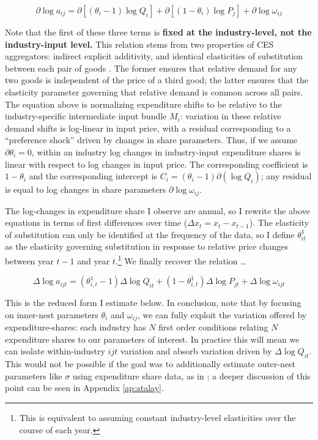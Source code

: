 \documentclass[11pt]{article}
\begin{document}
\[
\partial \log a_{ij} = \partial [(\theta_i - 1) \log Q_{i}] + \partial[(1-\theta_i)\log P_j] + \partial \log \omega_{ij}
\]

Note that the first of these three terms is \textbf{fixed at the industry-level, not the industry-input level.} This relation stems from two properties of CES aggregators: indirect explicit additivity, and identical elasticities of substitution between each pair of goods \citep{matsuyamaNonCESAggregatorsGuided2023}. The former ensures that relative demand for any two goods is independent of the price of a third good; the latter ensures that the elasticity parameter governing that relative demand is common across all pairs. The equation above is normalizing expenditure shifts to be relative to the industry-specific intermediate input bundle $M_i$: variation in these relative demand shifts is log-linear in input price, with a residual corresponding to a ``preference shock'' driven by changes in share parameters. Thus, if we assume $\partial \theta_i = 0$, within an industry log changes in industry-input expenditure shares is linear with respect to log changes in input price. The corresponding coefficient is $1-\theta_i$ and the corresponding intercept is $C_i = (\theta_i - 1) \partial(\log Q_{i})$; any residual is equal to log changes in share parameters $\partial \log \omega_{ij}$.

The log-changes in expenditure share I observe are annual, so I rewrite the above equations in terms of first differences over time ($\Delta x_t = x_t - x_{t-1}$). The elasticity of substitution can only be identified at the frequency of the data, so I define $\theta_{it}^1$ as the elasticity governing substitution in response to relative price changes between year $t-1$ and year $t$.\footnote{This is equivalent to assuming constant industry-level elasticities over the course of each year.} We finally recover the relation \dots

\begin{equation}
\label{eq:reduced_form}
\Delta \log a_{ijt} = (\theta^1_{i,t} - 1) \Delta \log Q_{it} + (1-\theta^{1}_{i,t}) \Delta \log P_{jt} + \Delta \log \omega_{ijt}
\end{equation}

This is the reduced form I estimate below. In conclusion, note that by focusing on inner-nest parameters $\theta_i$ and $\omega_{ij}$, we can fully exploit the variation offered by expenditure-shares: each industry has $N$ first order conditions relating $N$ expenditure shares to our parameters of interest. In practice this will mean we can isolate within-industry $ijt$ variation and absorb variation driven by $\Delta \log Q_{it}$. This would not be possible if the goal was to additionally estimate outer-nest parameters like $\sigma$ using expenditure share data, as in \citet{atalayHowImportantAre2017}; a deeper discussion of this point can be seen in Appendix \ref{ap:atalay}. 
\end{document}
